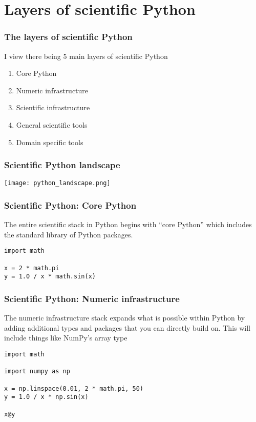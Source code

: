 \documentclass[
    xcolor={svgnames,dvipsnames},
    hyperref={colorlinks, citecolor=DeepPink4, linkcolor=DarkRed, urlcolor=DarkBlue}
]{beamer}  %
\newcommand{\1}{\mathbbm 1}
\begin{document}
\section{Layers of scientific Python}
\begin{frame}
    \frametitle{The layers of scientific Python}

    I view there being 5 main layers of scientific Python

    \begin{enumerate}
        \item Core Python
        \item Numeric infrastructure
        \item Scientific infrastructure
        \item General scientific tools
        \item Domain specific tools
    \end{enumerate}

\end{frame}

\begin{frame}
    \frametitle{Scientific Python landscape}

    \begin{center}
        \texttt{[image: python\_landscape.png]}
    \end{center}

\end{frame}

\begin{frame}[fragile]
    \frametitle{Scientific Python: Core Python}

    The entire scientific stack in Python begins with ``core Python'' which includes the standard
    library of Python packages.

    \begin{verbatim}
import math

x = 2 * math.pi
y = 1.0 / x * math.sin(x)
    \end{verbatim}

\end{frame}

\begin{frame}[fragile]
    \frametitle{Scientific Python: Numeric infrastructure}

    The numeric infrastructure stack expands what is possible within Python by adding additional
    types and packages that you can directly build on. This will include things like NumPy's
    array type

    \begin{verbatim}
import math

import numpy as np

x = np.linspace(0.01, 2 * math.pi, 50)
y = 1.0 / x * np.sin(x)

x@y
    \end{verbatim}

\end{frame}
\end{document}
